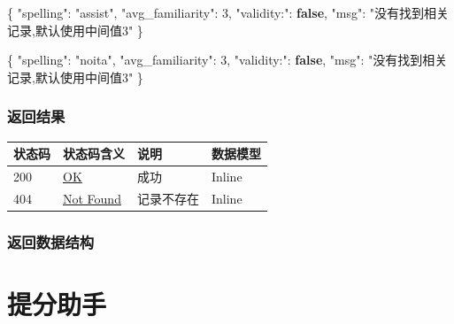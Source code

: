 \documentclass[
]{article}
\newenvironment{Shaded}{}{}
\newcommand{\DataTypeTok}[1]{\textcolor[rgb]{0.56,0.13,0.00}{#1}}
\newcommand{\DecValTok}[1]{\textcolor[rgb]{0.25,0.63,0.44}{#1}}
\newcommand{\FunctionTok}[1]{\textcolor[rgb]{0.02,0.16,0.49}{#1}}
\newcommand{\KeywordTok}[1]{\textcolor[rgb]{0.00,0.44,0.13}{\textbf{#1}}}
\newcommand{\StringTok}[1]{\textcolor[rgb]{0.25,0.44,0.63}{#1}}
\begin{document}
\begin{Shaded}
\begin{Highlighting}[]
\FunctionTok{\{}
  \DataTypeTok{"spelling"}\FunctionTok{:} \StringTok{"assist"}\FunctionTok{,}
  \DataTypeTok{"avg\_familiarity"}\FunctionTok{:} \DecValTok{3}\FunctionTok{,}
  \DataTypeTok{"validity:"}\FunctionTok{:} \KeywordTok{false}\FunctionTok{,}
  \DataTypeTok{"msg"}\FunctionTok{:} \StringTok{"没有找到相关记录,默认使用中间值3"}
\FunctionTok{\}}
\end{Highlighting}
\end{Shaded}

\begin{Shaded}
\begin{Highlighting}[]
\FunctionTok{\{}
  \DataTypeTok{"spelling"}\FunctionTok{:} \StringTok{"noita"}\FunctionTok{,}
  \DataTypeTok{"avg\_familiarity"}\FunctionTok{:} \DecValTok{3}\FunctionTok{,}
  \DataTypeTok{"validity:"}\FunctionTok{:} \KeywordTok{false}\FunctionTok{,}
  \DataTypeTok{"msg"}\FunctionTok{:} \StringTok{"没有找到相关记录,默认使用中间值3"}
\FunctionTok{\}}
\end{Highlighting}
\end{Shaded}

\hypertarget{ux8fd4ux56deux7ed3ux679c-8}{%
\subsubsection{返回结果}\label{ux8fd4ux56deux7ed3ux679c-8}}

\begin{longtable}[]{@{}llll@{}}
\toprule
状态码 & 状态码含义 & 说明 & 数据模型 \\
\midrule
\endhead
200 & \href{https://tools.ietf.org/html/rfc7231\#section-6.3.1}{OK} &
成功 & Inline \\
404 & \href{https://tools.ietf.org/html/rfc7231\#section-6.5.4}{Not
Found} & 记录不存在 & Inline \\
\bottomrule
\end{longtable}

\hypertarget{ux8fd4ux56deux6570ux636eux7ed3ux6784-8}{%
\subsubsection{返回数据结构}\label{ux8fd4ux56deux6570ux636eux7ed3ux6784-8}}

\hypertarget{ux63d0ux5206ux52a9ux624b}{%
\section{提分助手}\label{ux63d0ux5206ux52a9ux624b}}
\end{document}

